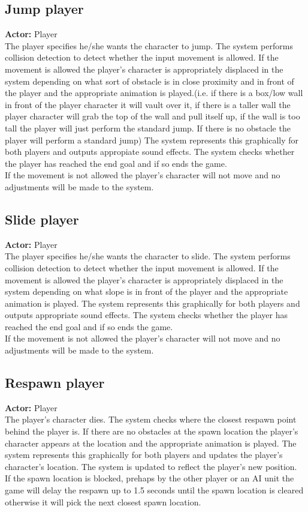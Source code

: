 \documentclass[a4paper,10pt]{article}
\begin{document}
\subsection{Jump player}
\textbf{Actor:} Player\smallskip\\
The player specifies he/she wants the character to jump. The system performs collision detection to detect whether the input movement is allowed. If the movement is allowed the player's character is appropriately displaced in the system depending on what sort of obstacle is in close proximity and in front of the player and the appropriate animation is played.(i.e. if there is a box/low wall in front of the player character it will vault over it, if there is a taller wall the player character will grab the top of the wall and pull itself up, if the wall is too tall the player will just perform the standard jump. If there is no obstacle the player will perform a standard jump) The system represents this graphically for both players and outputs appropiate sound effects. The system checks whether the player has reached the end goal and if so ends the game.\smallskip\\
If the movement is not allowed the player's character will not move and no adjustments will be made to the system.

\subsection{Slide player}
\textbf{Actor:} Player\smallskip\\
The player specifies he/she wants the character to slide. The system performs collision detection to detect whether the input movement is allowed. If the movement is allowed the player's character is appropriately displaced in the system depending on what slope is in front of the player and the appropriate animation is played. The system represents this graphically for both players and outputs appropriate sound effects. The system checks whether the player has reached the end goal and if so ends the game.\smallskip\\
If the movement is not allowed the player's character will not move and no adjustments will be made to the system.

\subsection{Respawn player}
\textbf{Actor:} Player\smallskip\\
The player's character dies. The system checks where the closest respawn point behind the player is. If there are no obstacles at the spawn location the player's character appears at the location and the appropriate animation is played. The system represents this graphically for both players and updates the player's character's location.  The system is updated to reflect the player's new position.\smallskip\\
If the spawn location is blocked, prehaps by the other player or an AI unit the game will delay the respawn up to 1.5 seconds until the spawn location is cleared otherwise it will pick the next closest spawn location.
\end{document}
